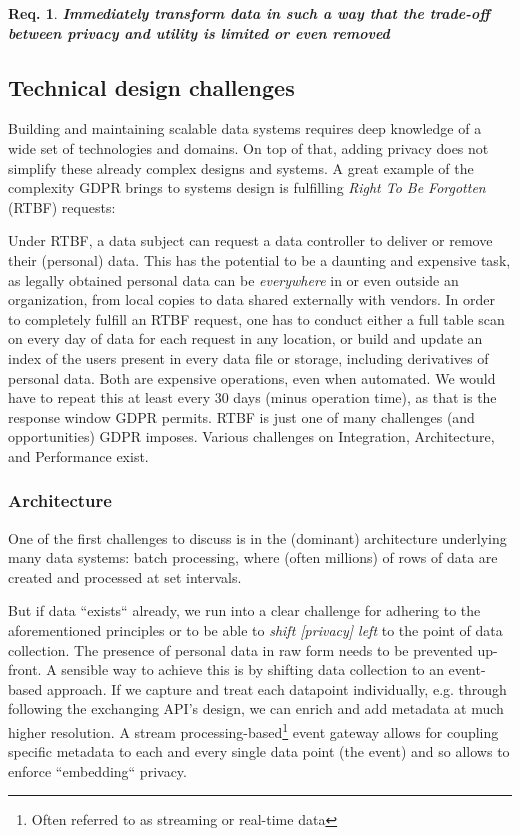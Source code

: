 \documentclass[11pt]{article} %
\newtheorem{requirement}{Req.}
\begin{document}
\begin{requirement}
\textit{\textbf{Immediately transform data in such a way that the trade-off between privacy and utility is limited or
even removed}}
\end{requirement}

\subsection{Technical design challenges}
Building and maintaining scalable data systems requires deep knowledge of a wide set of technologies and domains. On top of that, adding privacy does not simplify these already complex designs and systems. A great example of the complexity GDPR brings to systems design is fulfilling \emph{Right To Be Forgotten} (RTBF) requests: 

Under RTBF, a data subject can request a data controller to deliver or remove their (personal) data. This has the potential to be a daunting and expensive task, as legally obtained personal data can be \textit{everywhere} in or even outside an organization, from local copies to data shared externally with vendors. In order to completely fulfill an RTBF request, one has to conduct either a full table scan on every day of data for each request in any location, or build and update an index of the users present in every data file or storage, including derivatives of personal data. Both are expensive operations, even when automated. We would have to repeat this at least every 30 days (minus operation time), as that is the response window GDPR permits.
%
RTBF is just one of many challenges (and opportunities) GDPR imposes. Various challenges on Integration, Architecture, and Performance exist.

\newpage
\subsubsection{Architecture}
One of the first challenges to discuss is in the (dominant) architecture underlying many data systems: batch processing, where (often millions) of rows of data are created and processed at set intervals. 

But if data ``exists`` already, we run into a clear challenge for adhering to the aforementioned principles or to be able to \textit{shift [privacy] left} to the point of data collection. The presence of personal data in raw form needs to be prevented up-front. A sensible way to achieve this is by shifting data collection to an event-based approach. If we capture and treat each datapoint individually, e.g. through following the exchanging API's design, we can enrich and add metadata at much higher resolution. A stream processing-based\footnote{Often referred to as streaming or real-time data} event gateway allows for coupling specific metadata to each and every single data point (the event) and so allows to enforce ``embedding`` privacy. 
\end{document}
